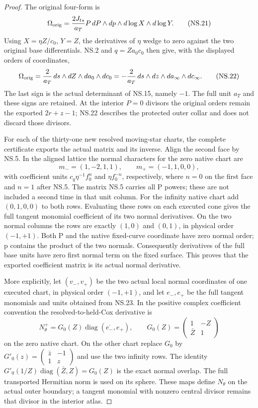 \begin{proof}
The original four-form is
\[
 \Omega_{\rm orig}=\frac{2J_{ts}}{a_T}P\,
 dP\wedge dp\wedge d\log X\wedge d\log Y.
 \tag{NS.21}
\]
Using \(X=\eta Z/c_0\), \(Y=Z\), the derivatives of \(\eta\)
wedge to zero against the two original base differentials. NS.2 and
\(q=Za_0c_0\) then give, with the displayed orders of coordinates,
\[
 \Omega_{\rm orig}=\frac2{a_T}\,ds\wedge dZ\wedge da_0\wedge dc_0
 =-\frac2{a_T}\,ds\wedge dz\wedge da_\infty\wedge dc_\infty.
 \tag{NS.22}
\]
The last sign is the actual determinant of NS.15, namely \(-1\).
The full unit \(a_T\) and these signs are retained. At the interior
\(P=0\) divisors the original orders remain the exported
\(2r+z-1\); NS.22 describes the protected outer collar and does
not discard those divisors.

For each of the thirty-one new resolved moving-star charts, the
complete certificate exports the actual matrix and its inverse. Align
the second face by NS.5. In the aligned lattice the normal characters
for the zero native chart are
\[
 m_-=(1,-2,1,1),\qquad m_+=(-1,1,0,0),
 \tag{NS.23}
\]
with coefficient units \(c_q\eta^{-1}f_0^n\) and
\(\eta f_0^{-n}\), respectively, where \(n=0\) on the first
face and \(n=1\) after NS.5. The matrix NS.5 carries all P powers;
these are not included a second time in that unit column. For the
infinity native chart add \((0,1,0,0)\) to both rows. Evaluating
these rows on each executed cone gives the full tangent monomial
coefficient of its two normal derivatives. On the two normal columns
the rows are exactly \((1,0)\) and \((0,1)\), in physical order
\((-1,+1)\). Both P and the native fixed-curve coordinate have
zero normal order; p contains the product of the two normals.
Consequently derivatives of the full base units have zero first
normal term on the fixed surface. This proves that the exported
coefficient matrix is its actual normal derivative.

More explicitly, let \((v_-,v_+)\) be the two actual local normal
coordinates of one executed chart, in physical order \((-1,+1)\),
and let \(e_-,e_+\) be the full tangent monomials and units obtained
from NS.23. In the positive complex coefficient convention the
resolved-to-held-Cox derivative is
\[
 N_\theta^+=G_0(Z)\operatorname{diag}(\overline{e_-},e_+),
 \qquad G_0(Z)=\begin{pmatrix}1&-Z\\\bar Z&1\end{pmatrix}
 \tag{NS.23a}
\]
on the zero native chart. On the other chart replace \(G_0\) by
\(G'_0(z)=\left(\begin{smallmatrix}\bar z&-1\\1&z\end{smallmatrix}\right)\)
and use the two infinity rows. The identity
\(G'_0(1/Z)\operatorname{diag}(\bar Z,Z)=G_0(Z)\)
is the exact normal overlap. The full transported Hermitian norm is
used on its sphere. These maps define \(N_\theta\) on the actual
outer boundary; a tangent monomial with nonzero central divisor
remains that divisor in the interior atlas.


\end{proof}
